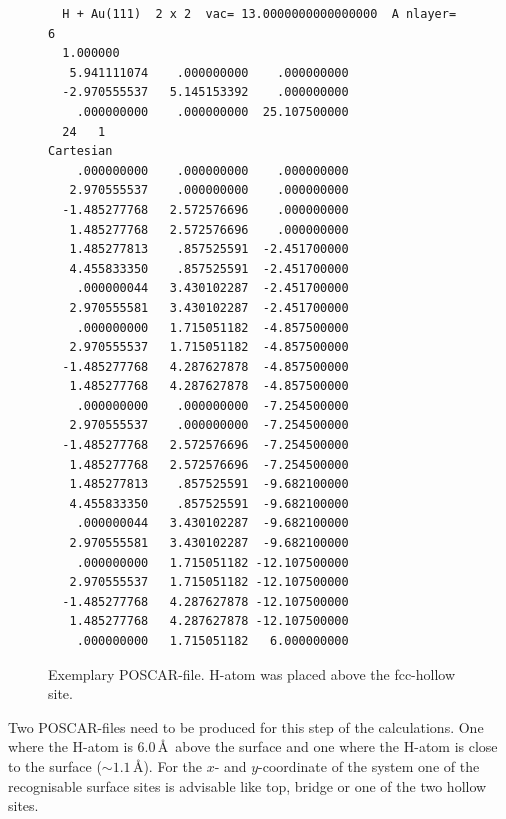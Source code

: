 \documentclass[11pt,oneside,a4paper, captions=nooneline, headsepline]{article}%
\begin{document}
\begin{figure}[h!!]
\begin{verbatim}
  H + Au(111)  2 x 2  vac= 13.0000000000000000  A nlayer=  6 
  1.000000
   5.941111074    .000000000    .000000000
  -2.970555537   5.145153392    .000000000
    .000000000    .000000000  25.107500000
  24   1
Cartesian
    .000000000    .000000000    .000000000
   2.970555537    .000000000    .000000000
  -1.485277768   2.572576696    .000000000
   1.485277768   2.572576696    .000000000
   1.485277813    .857525591  -2.451700000
   4.455833350    .857525591  -2.451700000
    .000000044   3.430102287  -2.451700000
   2.970555581   3.430102287  -2.451700000
    .000000000   1.715051182  -4.857500000
   2.970555537   1.715051182  -4.857500000
  -1.485277768   4.287627878  -4.857500000
   1.485277768   4.287627878  -4.857500000
    .000000000    .000000000  -7.254500000
   2.970555537    .000000000  -7.254500000
  -1.485277768   2.572576696  -7.254500000
   1.485277768   2.572576696  -7.254500000
   1.485277813    .857525591  -9.682100000
   4.455833350    .857525591  -9.682100000
    .000000044   3.430102287  -9.682100000
   2.970555581   3.430102287  -9.682100000
    .000000000   1.715051182 -12.107500000
   2.970555537   1.715051182 -12.107500000
  -1.485277768   4.287627878 -12.107500000
   1.485277768   4.287627878 -12.107500000
    .000000000   1.715051182   6.000000000

\end{verbatim}
\caption{Exemplary POSCAR-file. H-atom was placed above the fcc-hollow site.}
\label{cpos}
\end{figure}
Two POSCAR-files need to be produced for this step of the calculations. One where the H-atom is 6.0\,\AA~above the surface and one where the H-atom is close to the surface ($\sim 1.1$\,\AA). For the $x$- and $y$-coordinate of the system one of the recognisable surface sites is advisable like top, bridge or one of the two hollow sites.\\
\end{document}
